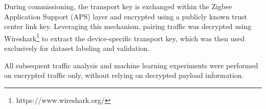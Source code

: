During commissioning, the transport key is exchanged within the Zigbee Application Support (APS) layer and encrypted using a publicly known trust center link key. Leveraging this mechanism, pairing traffic was decrypted using Wireshark\footnote{https://www.wireshark.org/} to extract the device-specific transport key, which was then used exclusively for dataset labeling and validation.

All subsequent traffic analysis and machine learning experiments were performed on encrypted traffic only, without relying on decrypted payload information.

